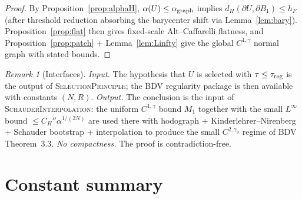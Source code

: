 \documentclass[11pt]{article}
\theoremstyle{definition}
\theoremstyle{remark}
\newtheorem{remark}[theorem]{Remark}
\newcommand{\BB}{B_1}
\newcommand{\dH}{d_H}
\begin{document}
\begin{proof}
By Proposition~\ref{prop:alphaH}, $\alpha(U)\le\alpha_{\rm graph}$ implies
$\dH(\partial U,\partial\BB)\le h_F$ (after threshold reduction absorbing
the barycenter shift via Lemma~\ref{lem:bary}). Proposition~\ref{prop:flat}
then gives fixed-scale Alt--Caffarelli flatness, and
Proposition~\ref{prop:patch} + Lemma~\ref{lem:Linfty} give the global
$C^{1,\gamma}$ normal graph with stated bounds.
\end{proof}

\begin{remark}[Interfaces]\label{rem:interfaces}
\emph{Input.} The hypothesis that $U$ is selected with
$\tau\le\tau_{\rm reg}$ is the output of \textsc{SelectionPrinciple}; the
BDV regularity package is then available with constants $(N,R)$.
\emph{Output.} The conclusion is the input of \textsc{SchauderInterpolation}:
the uniform $C^{1,\gamma}$ bound $M_1$ together with the small $L^\infty$
bound $\le C_H''\alpha^{1/(2N)}$ are used there with hodograph +
Kinderlehrer--Nirenberg + Schauder bootstrap + interpolation to produce
the small $C^{2,\gamma_0}$ regime of BDV Theorem~3.3.
\emph{No compactness.} The proof is contradiction-free.
\end{remark}

\section{Constant summary}\label{sec:constants}
\end{document}
